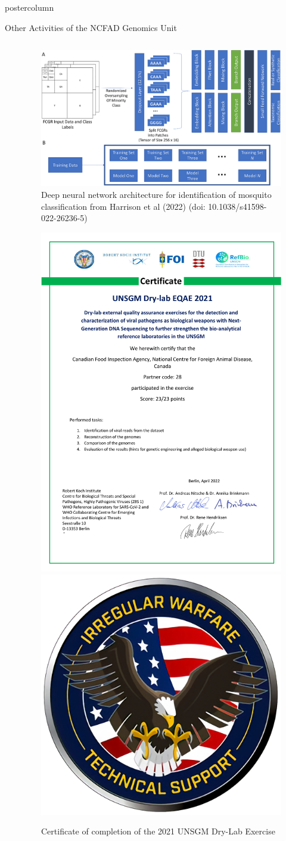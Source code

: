 \documentclass[final]{beamer}
\begin{document}
\begin{frame}
\begin{columns}
\begin{column}{.5\textwidth}
\begin{beamercolorbox}[center,wd=\textwidth]{postercolumn}
\begin{minipage}[T]{.95\textwidth}
{\begin{block}{Other Activities of the NCFAD Genomics Unit}
\begin{columns}
\begin{column}{0.7\textwidth}
      \end{column}
      \begin{column}{0.3\textwidth}
        \begin{figure}
          \includegraphics[width=0.95\linewidth]{images/neural-net-culicidae-mitogenomes-figure-4.png}
          \caption{\tiny Deep neural network architecture for identification of mosquito classification from Harrison et al (2022) (doi: 10.1038/s41598-022-26236-5)}
        \end{figure}
        

        \begin{figure}
          
        \centering
        \includegraphics[align=c,width=0.4\linewidth]{images/UNSGM_DryLab_Certificate-28.pdf}
        \includegraphics[align=c,width=0.3\linewidth]{images/IWTSDLogo.png}
        \caption{\tiny{Certificate of completion of the 2021 UNSGM Dry-Lab Exercise}}
        \end{figure}
        

\end{column}
\end{columns}
\end{block}}
\end{minipage}
\end{beamercolorbox}
\end{column}
\end{columns}
\end{frame}
\end{document}
